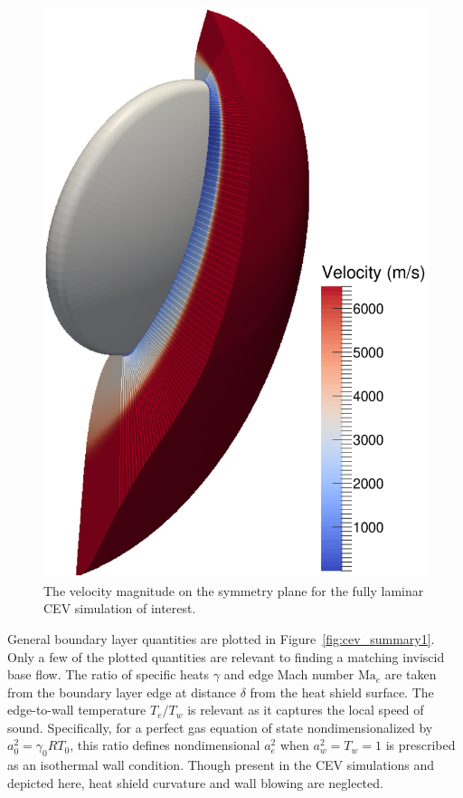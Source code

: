 \documentclass[letterpaper,11pt,nointlimits,reqno]{amsart}
\newcommand{\Mach}[1][]{\mbox{Ma}_{#1}}
\begin{document}
\begin{figure}[p]
  \centering
  \includegraphics[height=0.75\textheight]{symplanenorm}
  \caption{
    \label{fig:cev_symplane}
    The velocity magnitude on the symmetry plane for the fully laminar
    CEV simulation of interest.
  }
\end{figure}

General boundary layer quantities are plotted in Figure~\ref{fig:cev_summary1}.
Only a few of the plotted quantities are relevant to finding a matching
inviscid base flow.  The ratio of specific heats $\gamma$ and edge Mach number
$\Mach[e]{}$ are taken from the boundary layer edge at distance $\delta$ from
the heat shield surface.  The edge-to-wall temperature $T_e/T_w$ is relevant as
it captures the local speed of sound.  Specifically, for a perfect gas equation
of state nondimensionalized by $a_0^2=\gamma_{0}RT_0$, this ratio defines
nondimensional $a_e^2$ when $a_w^2=T_w=1$ is prescribed as an isothermal wall
condition.  Though present in the CEV simulations and depicted here, heat
shield curvature and wall blowing are neglected.
\end{document}
